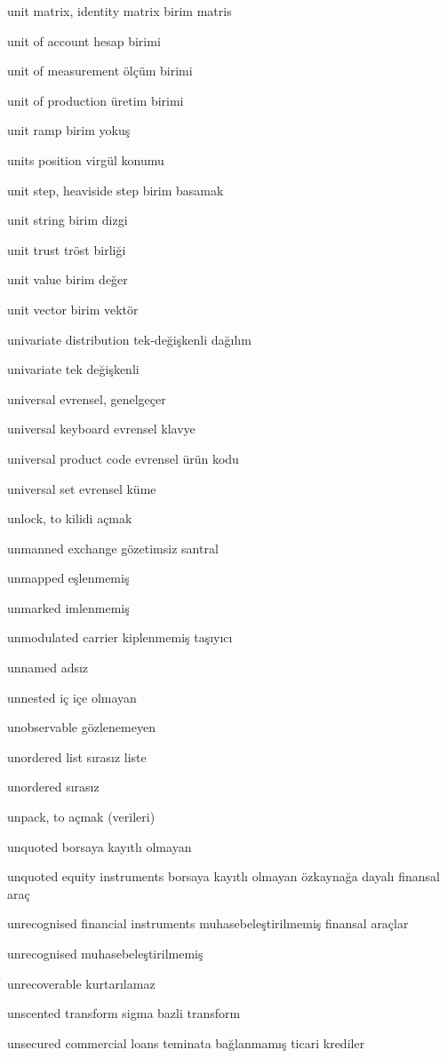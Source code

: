 \documentclass[12pt,fleqn]{article}\usepackage{../../common}
\begin{document}
unit matrix, identity matrix birim matris

unit of account hesap birimi

unit of measurement ölçüm birimi

unit of production üretim birimi

unit ramp birim yokuş

units position virgül konumu

unit step, heaviside step birim basamak

unit string birim dizgi

unit trust tröst birliği

unit value birim değer

unit vector birim vektör

univariate distribution tek-değişkenli dağılım

univariate tek değişkenli

universal evrensel, genelgeçer

universal keyboard evrensel klavye

universal product code evrensel ürün kodu

universal set evrensel küme

unlock, to kilidi açmak

unmanned exchange gözetimsiz santral

unmapped eşlenmemiş

unmarked imlenmemiş

unmodulated carrier kiplenmemiş taşıyıcı

unnamed adsız

unnested iç içe olmayan

unobservable gözlenemeyen

unordered list sırasız liste

unordered sırasız

unpack, to açmak (verileri)

unquoted borsaya kayıtlı olmayan

unquoted equity instruments borsaya kayıtlı olmayan özkaynağa dayalı finansal araç

unrecognised financial instruments muhasebeleştirilmemiş finansal araçlar

unrecognised muhasebeleştirilmemiş

unrecoverable kurtarılamaz

unscented transform sigma bazli transform

unsecured commercial loans teminata bağlanmamış ticari krediler
\end{document}

